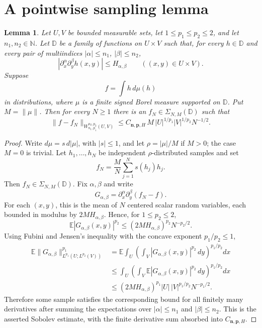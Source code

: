 \documentclass[11pt]{amsart}
\newtheorem{lemma}{Lemma}
\theoremstyle{remark}
\newcommand{\D}{\mathbb D}
\newcommand{\N}{\mathbb N}
\begin{document}
\section*{A pointwise sampling lemma}

\begin{lemma}
\label{lem:pointwise-sampling}
Let $U,V$ be bounded measurable sets, let $1\leq p_1\leq p_2\leq2$, and let
$n_1,n_2\in\N$.  Let $\D$ be a family of functions on $U\times V$ such that,
for every $h\in\D$ and every pair of multiindices $|\alpha|\leq n_1$,
$|\beta|\leq n_2$,
\[
        |\partial_x^\alpha\partial_y^\beta h(x,y)|
        \leq H_{\alpha,\beta}
        \qquad ((x,y)\in U\times V).
\]
Suppose
\[
        f=\int h\,d\mu(h)
\]
in distributions, where $\mu$ is a finite signed Borel measure supported on
$\D$.  Put $M=\|\mu\|$.  Then for every $N\geq1$ there is an
$f_N\in\Sigma_{N,M}(\D)$ such that
\[
 \|f-f_N\|_{W_{n_1,p_1}^{n_2,p_2}(U,V)}
 \leq
 C_{\mathbf n,\mathbf p,H}\,
 M\,|U|^{1/p_1}|V|^{1/p_2}N^{-1/2}.
\]
\end{lemma}

\begin{proof}
Write $d\mu=s\,d|\mu|$, with $|s|\leq1$, and let $\rho=|\mu|/M$ if
$M>0$; the case $M=0$ is trivial.  Let $h_1,\ldots,h_N$ be independent
$\rho$-distributed samples and set
\[
        f_N=\frac{M}{N}\sum_{j=1}^N s(h_j)h_j .
\]
Then $f_N\in\Sigma_{N,M}(\D)$.  Fix $\alpha,\beta$ and write
\[
        G_{\alpha,\beta}
        =\partial_x^\alpha\partial_y^\beta(f_N-f).
\]
For each $(x,y)$, this is the mean of $N$ centered scalar random variables,
each bounded in modulus by $2M H_{\alpha,\beta}$.  Hence, for
$1\leq p_2\leq2$,
\[
        \mathbb E |G_{\alpha,\beta}(x,y)|^{p_2}
        \leq
        (2M H_{\alpha,\beta})^{p_2}N^{-p_2/2}.
\]
Using Fubini and Jensen's inequality with the concave exponent
$p_1/p_2\leq1$,
\[
\begin{aligned}
\mathbb E\|G_{\alpha,\beta}\|_{L^{p_1}(U;L^{p_2}(V))}^{p_1}
&=
\mathbb E\int_U
   \left(\int_V |G_{\alpha,\beta}(x,y)|^{p_2}\,dy\right)^{p_1/p_2}dx \\
&\leq
\int_U
   \left(\int_V
       \mathbb E |G_{\alpha,\beta}(x,y)|^{p_2}\,dy
   \right)^{p_1/p_2}dx \\
&\leq
(2M H_{\alpha,\beta})^{p_1}
|U|\,|V|^{p_1/p_2}N^{-p_1/2}.
\end{aligned}
\]
Therefore some sample satisfies the corresponding bound for all finitely many
derivatives after summing the expectations over $|\alpha|\leq n_1$ and
$|\beta|\leq n_2$.  This is the asserted Sobolev estimate, with the finite
derivative sum absorbed into $C_{\mathbf n,\mathbf p,H}$.
\end{proof}
\end{document}
